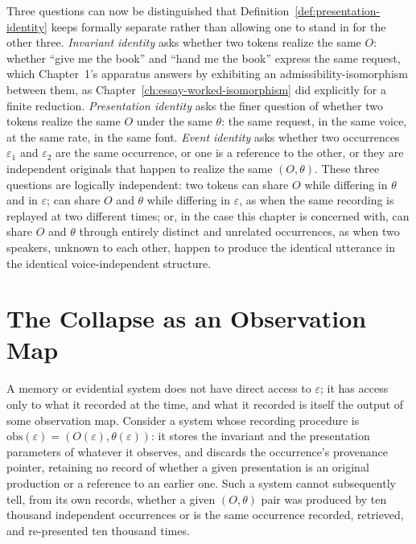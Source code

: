 Three questions can now be distinguished that Definition~\ref{def:presentation-identity} keeps formally separate rather than allowing one to stand in for the other three. \emph{Invariant identity} asks whether two tokens realize the same $O$: whether ``give me the book'' and ``hand me the book'' express the same request, which Chapter~1's apparatus answers by exhibiting an admissibility-isomorphism between them, as Chapter~\ref{ch:essay-worked-isomorphism} did explicitly for a finite reduction. \emph{Presentation identity} asks the finer question of whether two tokens realize the same $O$ under the same $\theta$: the same request, in the same voice, at the same rate, in the same font. \emph{Event identity} asks whether two occurrences $\varepsilon_1$ and $\varepsilon_2$ are the same occurrence, or one is a reference to the other, or they are independent originals that happen to realize the same $(O, \theta)$. These three questions are logically independent: two tokens can share $O$ while differing in $\theta$ and in $\varepsilon$; can share $O$ and $\theta$ while differing in $\varepsilon$, as when the same recording is replayed at two different times; or, in the case this chapter is concerned with, can share $O$ and $\theta$ through entirely distinct and unrelated occurrences, as when two speakers, unknown to each other, happen to produce the identical utterance in the identical voice-independent structure.

\section{The Collapse as an Observation Map}

A memory or evidential system does not have direct access to $\varepsilon$; it has access only to what it recorded at the time, and what it recorded is itself the output of some observation map. Consider a system whose recording procedure is $\mathrm{obs}(\varepsilon) = (O(\varepsilon), \theta(\varepsilon))$: it stores the invariant and the presentation parameters of whatever it observes, and discards the occurrence's provenance pointer, retaining no record of whether a given presentation is an original production or a reference to an earlier one. Such a system cannot subsequently tell, from its own records, whether a given $(O, \theta)$ pair was produced by ten thousand independent occurrences or is the same occurrence recorded, retrieved, and re-presented ten thousand times.

